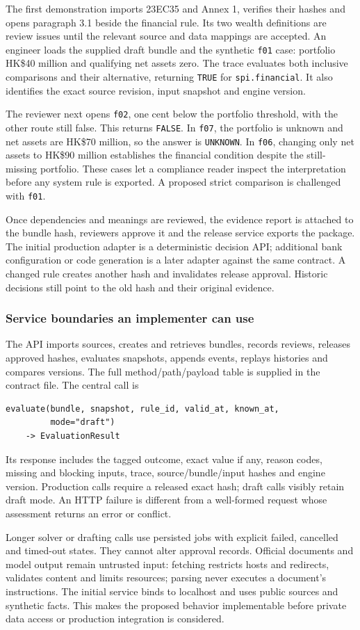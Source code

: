 The first demonstration imports 23EC35 and Annex 1, verifies their hashes and
opens paragraph 3.1 beside the financial rule. Its two wealth definitions are
review issues until the relevant source and data mappings are accepted. An
engineer loads the supplied draft bundle and the synthetic \texttt{f01} case:
portfolio HK\$40 million and qualifying net assets zero. The trace evaluates
both inclusive comparisons and their alternative, returning \texttt{TRUE} for
\texttt{spi.financial}. It also identifies the exact source revision, input
snapshot and engine version.

The reviewer next opens \texttt{f02}, one cent below the portfolio threshold,
with the other route still false. This returns \texttt{FALSE}. In \texttt{f07},
the portfolio is unknown and net assets are HK\$70 million, so the answer is
\texttt{UNKNOWN}. In \texttt{f06}, changing only net assets to HK\$90 million
establishes the financial condition despite the still-missing portfolio. These
cases let a compliance reader inspect the interpretation before any system rule
is exported. A proposed strict comparison is challenged with \texttt{f01}.

Once dependencies and meanings are reviewed, the evidence report is attached to
the bundle hash, reviewers approve it and the release service exports the package.
The initial production adapter is a deterministic decision API; additional bank
configuration or code generation is a later adapter against the same contract.
A changed rule creates another hash and invalidates release approval. Historic
decisions still point to the old hash and their original evidence.

\subsubsection{Service boundaries an implementer can use}

The API imports sources, creates and retrieves bundles, records reviews, releases
approved hashes, evaluates snapshots, appends events, replays histories and
compares versions. The full method/path/payload table is supplied in the contract
file. The central call is
\begin{lstlisting}
evaluate(bundle, snapshot, rule_id, valid_at, known_at,
         mode="draft")
    -> EvaluationResult
\end{lstlisting}
Its response includes the tagged outcome, exact value if any, reason codes,
missing and blocking inputs, trace, source/bundle/input hashes and engine version.
Production calls require a released exact hash; draft calls visibly retain draft
mode. An HTTP failure is different from a well-formed request whose assessment
returns an error or conflict.

Longer solver or drafting calls use persisted jobs with explicit failed,
cancelled and timed-out states. They cannot alter approval records. Official
documents and model output remain untrusted input: fetching restricts hosts and
redirects, validates content and limits resources; parsing never executes a
document's instructions. The initial service binds to localhost and uses public
sources and synthetic facts. This makes the proposed behavior implementable
before private data access or production integration is considered.

